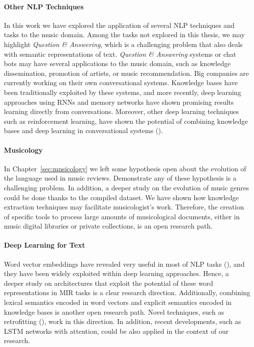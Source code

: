 \paragraph{Other NLP Techniques} In this work we have explored the application of several NLP techniques and tasks to the music domain. Among the tasks not explored in this thesis, we may highlight \textit{Question \& Answering}, which is a challenging problem that also deals with semantic representations of text. \textit{Question \& Answering} systems or chat bots may have several applications to the music domain, such as knowledge dissemination, promotion of artists, or music recommendation. Big companies are currently working on their own conversational systems. Knowledge bases have been traditionally exploited by these systems, and more recently, deep learning approaches using RNNs and memory networks have shown promising results learning directly from conversations. Moreover, other deep learning techniques such as reinforcement learning, have shown the potential of combining knowledge bases and deep learning in conversational systems (\cite{andreas2016learning}).

\paragraph{Musicology}
In Chapter~\ref{sec:musicology} we left some hypothesis open about the evolution of the language used in music reviews. Demonstrate any of these hypothesis is a challenging problem. In addition, a deeper study on the evolution of music genres could be done thanks to the compiled dataset. We have shown how knowledge extraction techniques may facilitate musicologist's work. Therefore, the creation of specific tools to process large amounts of musicological documents, either in music digital libraries or private collections, is an open research path.

\paragraph{Deep Learning for Text} Word vector embeddings have revealed very useful in most of NLP tasks (\cite{Collobert2011}), and they have been widely exploited within deep learning approaches. Hence, a deeper study on architectures that exploit the potential of these word representations in MIR tasks is a clear research direction. Additionally, combining lexical semantics encoded in word vectors and explicit semantics encoded in knowledge bases is another open research path. Novel techniques, such as retrofitting (\cite{faruqui2014retrofitting}), work in this direction. In addition, recent developments, such as LSTM networks with attention, could be also applied in the context of our research.

